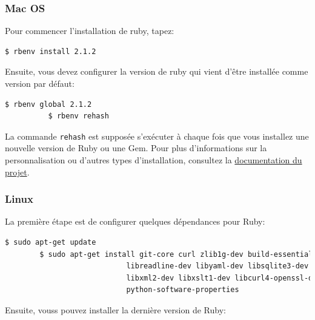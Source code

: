 \documentclass[]{report}
\begin{document}
      \subsubsection{Mac OS}

        Pour commencer l'installation de ruby, tapez:

        \begin{scriptsize}
          \begin{lstlisting}[language=bash]
          $ rbenv install 2.1.2
          \end{lstlisting}
        \end{scriptsize}

        Ensuite, vous devez configurer la version de ruby qui vient d'être installée comme version par défaut:

        \begin{scriptsize}
          \begin{lstlisting}[language=bash]
          $ rbenv global 2.1.2
          $ rbenv rehash
          \end{lstlisting}
        \end{scriptsize}

        La commande \verb|rehash| est supposée s'exécuter à chaque fois que vous installez une nouvelle version de Ruby ou une Gem. Pour plus d'informations sur la personnalisation ou d'autres types d'installation, consultez la \href{https://github.com/sstephenson/rbenv}{documentation du projet}.

      \subsubsection{Linux}

        La première étape est de configurer quelques dépendances pour Ruby:

        \begin{scriptsize}
        \begin{lstlisting}[language=bash]
        $ sudo apt-get update
        $ sudo apt-get install git-core curl zlib1g-dev build-essential libssl-dev \
                            libreadline-dev libyaml-dev libsqlite3-dev sqlite3 \
                            libxml2-dev libxslt1-dev libcurl4-openssl-dev zlib1g-dev \
                            python-software-properties
        \end{lstlisting}
        \end{scriptsize}

        Ensuite, vouss pouvez installer la dernière version de Ruby:
\end{document}
